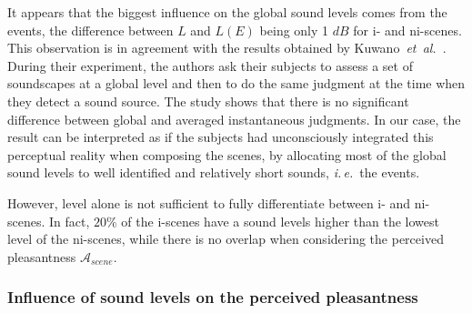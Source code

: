 \documentclass[12pt]{elsarticle}
\newcommand{\ie}{\emph{i.\,e.}}
\newcommand{\al}{\emph{et~al.}}
\begin{document}

It appears that the biggest influence on the global sound levels comes from the events, the difference between $L$ and $L(E)$ being only 1 $dB$ for i- and ni-scenes. This observation is in agreement with the results obtained by Kuwano~\al~\cite{kuwano_memory_2003}. During their experiment, the authors ask their subjects to assess a set of soundscapes at a global level and then to do the same judgment at the time when they detect a sound source. The study shows that there is no significant difference between global and averaged instantaneous judgments. In our case, the result can be interpreted as if the subjects had unconsciously integrated this perceptual reality when composing the scenes, by allocating most of the global sound levels to well identified and relatively short sounds, \ie~the events.


However, level alone is not sufficient to fully differentiate between i- and ni-scenes. In fact, $20\%$ of the i-scenes have a sound levels higher than the lowest level of the ni-scenes, while there is no overlap when considering the perceived pleasantness $\mathcal{A}_{scene}$.

\subsubsection*{Influence of sound levels on the perceived pleasantness}
\end{document}
